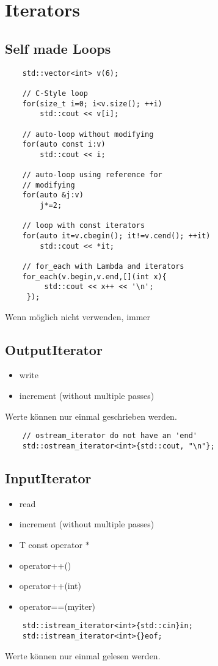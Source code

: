\section{Iterators}
\subsection{Self made Loops}
\begin{lstlisting}
	std::vector<int> v(6);
	
	// C-Style loop
	for(size_t i=0; i<v.size(); ++i)
		std::cout << v[i];
	
	// auto-loop without modifying
	for(auto const i:v)
		std::cout << i;
	
	// auto-loop using reference for 
	// modifying
	for(auto &j:v)
		j*=2;

	// loop with const iterators
	for(auto it=v.cbegin(); it!=v.cend(); ++it)
		std::cout << *it;
		
	// for_each with Lambda and iterators
	for_each(v.begin,v.end,[](int x){
		 std::cout << x++ << '\n';
	 });
\end{lstlisting}
Wenn möglich nicht verwenden, immer 


\subsection{OutputIterator}
\begin{itemize}
	\item write
	\item increment (without multiple passes)
\end{itemize}
Werte können nur einmal geschrieben werden.
\begin{lstlisting}
	// ostream_iterator do not have an 'end'
	std::ostream_iterator<int>{std::cout, "\n"};
\end{lstlisting}

\subsection{InputIterator}
\begin{itemize}
	\item read
	\item increment (without multiple passes)
	\item T const operator $*$
	\item operator++()
	\item operator++(int)
	\item operator==(myiter)
\end{itemize}
\begin{lstlisting}
	std::istream_iterator<int>{std::cin}in;
	std::istream_iterator<int>{}eof;
\end{lstlisting}
Werte können nur einmal gelesen werden.

